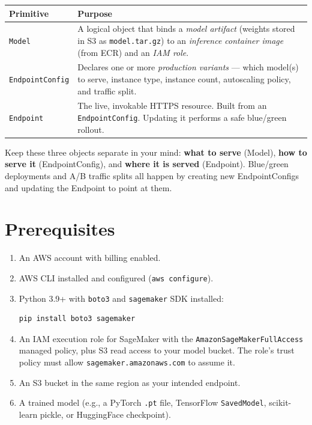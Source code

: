 \documentclass[11pt,a4paper]{article}
\begin{document}
\begin{longtable}{p{3.2cm} p{11.5cm}}
\toprule
\textbf{Primitive} & \textbf{Purpose} \\
\midrule
\texttt{Model} & A logical object that binds a \emph{model artifact} (weights stored
in S3 as \texttt{model.tar.gz}) to an \emph{inference container image} (from
ECR) and an \emph{IAM role}. \\
\addlinespace
\texttt{EndpointConfig} & Declares one or more \emph{production variants} --- which
model(s) to serve, instance type, instance count, autoscaling policy, and traffic
split. \\
\addlinespace
\texttt{Endpoint} & The live, invokable HTTPS resource. Built from an
\texttt{EndpointConfig}. Updating it performs a safe blue/green rollout. \\
\bottomrule
\end{longtable}

\begin{tipbox}
Keep these three objects separate in your mind: \textbf{what to serve} (Model),
\textbf{how to serve it} (EndpointConfig), and \textbf{where it is served}
(Endpoint). Blue/green deployments and A/B traffic splits all happen by creating
new EndpointConfigs and updating the Endpoint to point at them.
\end{tipbox}

\section{Prerequisites}

\begin{enumerate}[leftmargin=*]
    \item An AWS account with billing enabled.
    \item AWS CLI installed and configured (\texttt{aws configure}).
    \item Python 3.9+ with \texttt{boto3} and \texttt{sagemaker} SDK installed:
    \begin{lstlisting}[style=bashcode]
pip install boto3 sagemaker
    \end{lstlisting}
    \item An IAM execution role for SageMaker with the \texttt{AmazonSageMakerFullAccess}
          managed policy, plus S3 read access to your model bucket. The role's
          trust policy must allow \texttt{sagemaker.amazonaws.com} to assume it.
    \item An S3 bucket in the same region as your intended endpoint.
    \item A trained model (e.g., a PyTorch \texttt{.pt} file, TensorFlow
          \texttt{SavedModel}, scikit-learn pickle, or HuggingFace checkpoint).
\end{enumerate}
\end{document}
